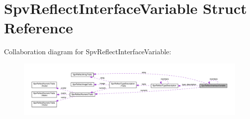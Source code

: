 \hypertarget{structSpvReflectInterfaceVariable}{}\section{Spv\+Reflect\+Interface\+Variable Struct Reference}
\label{structSpvReflectInterfaceVariable}


Collaboration diagram for Spv\+Reflect\+Interface\+Variable\+:\nopagebreak
\begin{figure}[H]
\begin{center}
\leavevmode
\includegraphics[width=350pt]{structSpvReflectInterfaceVariable__coll__graph}
\end{center}
\end{figure}
